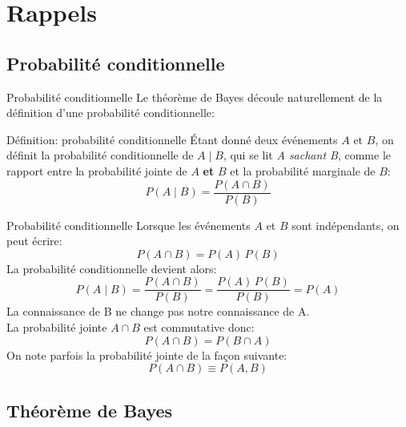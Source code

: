 \section[Rappels]{Rappels}

\subsection{Probabilité conditionnelle}

\begin{frame}{Probabilité conditionnelle}
	Le théorème de Bayes découle naturellement de la définition d'une probabilité conditionnelle:
	\begin{block}{Définition: probabilité conditionnelle}
		\'Etant donné deux événements $A$ et $B$, on définit la probabilité conditionnelle de $A \mid B$, qui se lit \textit{A sachant B}, comme le rapport entre la probabilité jointe de $A$ \textbf{et} $B$ et la probabilité marginale de $B$:
		\begin{equation}
			P(A \mid B) = \displaystyle \frac{P(A \cap B)}{P(B)}
			\nonumber
		\end{equation}
	\end{block}
\end{frame}

\begin{frame}{Probabilité conditionnelle}
	Lorsque les événements $A$ et $B$ sont indépendants, on peut écrire:
	\begin{equation}
		P(A \cap B) = P(A) \, P(B)
		\nonumber
	\end{equation}
	\pause
	La probabilité conditionnelle devient alors:
	\begin{equation}
		P(A \mid B) = \displaystyle \frac{P(A \cap B)}{P(B)} = \displaystyle \frac{P(A) \, P(B)}{P(B)} = P(A)
		\nonumber
	\end{equation}
	La connaissance de B ne change pas notre connaissance de A. \\
	\pause
	\vspace{0.3cm}
	La probabilité jointe $A \cap B$ est commutative donc:
	\begin{equation}
		P(A \cap B) = P(B \cap A)
		\nonumber
	\end{equation}
	\pause
	On note parfois la probabilité jointe de la façon suivante:
	\begin{equation}
		P(A \cap B) \equiv P(A, B)
		\nonumber
	\end{equation}
\end{frame}

\subsection{Théorème de Bayes}

